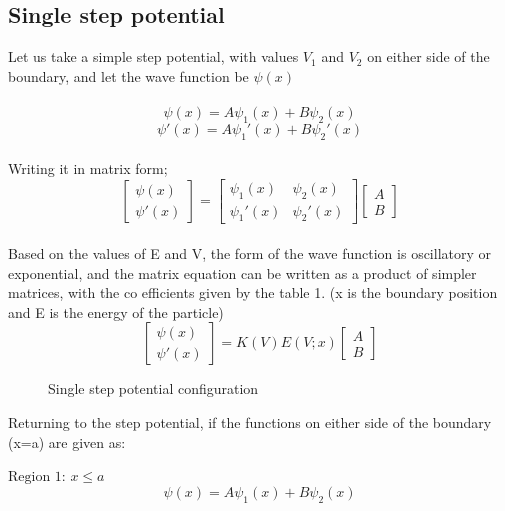 \documentclass{article}
\begin{document}
\subsection{Single step potential}
Let us take a simple step potential, with values $V_1$ and $V_2$ on either side of the boundary, and let the wave function be $\psi(x)$
\\
\\
$$\psi(x) = A\psi_1(x) + B\psi_2(x)$$
$$\psi'(x) = A\psi_1'(x) + B\psi_2'(x)$$
\\
Writing it in matrix form;
\[
\begin{bmatrix}
\psi(x) \\
\psi'(x)
\end{bmatrix}
= \begin{bmatrix}
\psi_1(x) & \psi_2(x) \\
\psi_1'(x) & \psi_2'(x)
\end{bmatrix}
\begin{bmatrix}
A \\
B
\end{bmatrix}
\]
\\
Based on the values of E and V, the form of the wave function is oscillatory or exponential, and the matrix equation can be written as a product of simpler matrices, with the co efficients given by the table 1. (x is the boundary position and E is the energy of the particle)
\[
\begin{bmatrix}
\psi(x) \\
\psi'(x)
\end{bmatrix}
= K(V)E(V;x)
\begin{bmatrix}
A \\
B
\end{bmatrix}
\]

\begin{figure}[h!]
\caption{Single step potential configuration}
\end{figure}

Returning to the step potential, if the functions on either side of the boundary (x=a) are given as:

$\text{Region 1: } x\leq a$
$$\psi(x) = A\psi_1(x) + B\psi_2(x)$$
\end{document}
